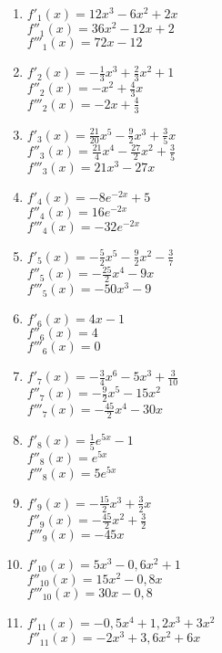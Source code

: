 \begin{Answer}[ref=hoehereAbleitungenA1]
	\begin{enumerate}[label=\alph*)]
		\item \(f'_1(x)=12x^3-6x^2+2x\)\\
		\(f''_1(x)=36x^2-12x+2\)\\
		\(f'''_1(x)=72x-12\)
		\item \(f'_2(x)=-\frac{1}{3}x^3+\frac{2}{3}x^2+1\)\\
		\(f''_2(x)=-x^2+\frac{4}{3}x\)\\
		\(f'''_2(x)=-2x+\frac{4}{3}\)
		\item \(f'_3(x)=\frac{21}{20}x^5-\frac{9}{2}x^3+\frac{3}{5}x\)\\
		\(f''_3(x)=\frac{21}{4}x^4-\frac{27}{2}x^2+\frac{3}{5}\)\\
		\(f'''_3(x)=21x^3-27x\)
		\item \(f'_4(x)=-8e^{-2x}+5\)\\
		\(f''_4(x)=16e^{-2x}\)\\
		\(f'''_4(x)=-32e^{-2x}\)
		\item \(f'_5(x)=-\frac{5}{2}x^5-\frac{9}{2}x^2-\frac{3}{7}\)\\
		\(f''_5(x)=-\frac{25}{2}x^4-9x\)\\
		\(f'''_5(x)=-50x^3-9\)
		\item \(f'_6(x)=4x-1\)\\
		\(f''_6(x)=4\)\\
		\(f'''_6(x)=0\)
		\item \(f'_7(x)=-\frac{3}{4}x^6-5x^3+\frac{3}{10}\)\\
		\(f''_7(x)=-\frac{9}{2}x^5-15x^2\)\\
		\(f'''_7(x)=-\frac{45}{2}x^4-30x\)
		\item \(f'_8(x)=\frac{1}{5}e^{5x}-1\)\\
		\(f''_8(x)=e^{5x}\)\\
		\(f'''_8(x)=5e^{5x}\)
		\item \(f'_9(x)=-\frac{15}{2}x^3+\frac{3}{2}x\)\\
		\(f''_9(x)=-\frac{45}{2}x^2+\frac{3}{2}\)\\
		\(f'''_9(x)=-45x\)
		\item \(f'_{10}(x)=5x^3-0,6x^2+1\)\\
		\(f''_{10}(x)=15x^2-0,8x\)\\
		\(f'''_{10}(x)=30x-0,8\)
		\item \(f'_{11}(x)=-0,5x^4+1,2x^3+3x^2\)\\
		\(f''_{11}(x)=-2x^3+3,6x^2+6x\)\\

\end{enumerate}
\end{Answer}

